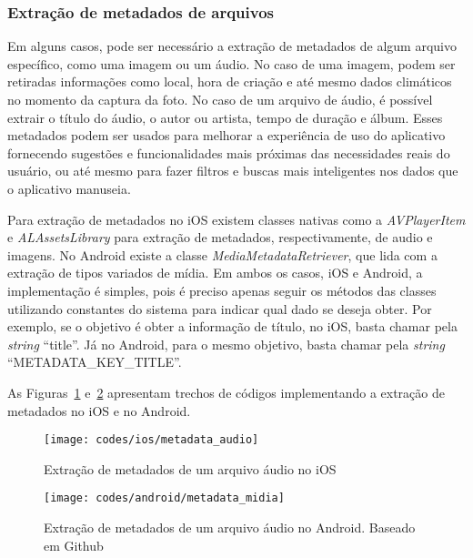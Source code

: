 \subsubsection{Extração de metadados de arquivos} \label{subsubsec:extracaometadata}
Em alguns casos, pode ser necessário a extração de metadados de algum arquivo específico, como uma imagem ou um áudio. No caso de uma imagem, podem ser retiradas informações como local, hora de criação e até mesmo 
dados climáticos no momento da captura da foto. No caso de um arquivo de áudio, é possível extrair o título do áudio, o autor ou artista, tempo de duração e álbum. Esses metadados podem ser usados para 
melhorar a experiência de uso do aplicativo fornecendo sugestões e funcionalidades mais próximas das necessidades reais do usuário, ou até mesmo para fazer filtros e buscas mais inteligentes nos dados que o 
aplicativo manuseia. 

Para extração de metadados no iOS existem classes nativas como a \textit{AVPlayerItem} e \textit{ALAssetsLibrary} para extração de metadados, respectivamente, de audio e imagens. No Android existe a 
classe \textit{MediaMetadataRetriever}, que lida com a extração de tipos variados de mídia. Em ambos os casos, iOS e Android, a implementação é simples, pois é preciso apenas seguir os métodos das classes 
utilizando constantes do sistema para indicar qual dado se deseja obter. Por exemplo, se o objetivo é obter a informação de título, no iOS, basta chamar pela \textit{string} ``title''. Já no Android, para o mesmo 
objetivo, basta chamar pela \textit{string} ``METADATA\_KEY\_TITLE''.

As Figuras~\ref{fig:metadata_audio-ios} e~\ref{fig:metadata_midia-android} apresentam trechos de códigos implementando a extração de metadados no iOS e no Android.

\begin{figure}[H]
	\centering
	\texttt{[image: codes/ios/metadata\_audio]}
	\caption[Extração de metadados de um arquivo áudio no iOS]{Extração de metadados de um arquivo áudio no iOS}
	\label{fig:metadata_audio-ios}
\end{figure}

\begin{figure}[H]
	\centering
	\texttt{[image: codes/android/metadata\_midia]}
	\caption[Extração de metadados de um arquivo áudio no Android]{Extração de metadados de um arquivo áudio no Android. Baseado em Github\protect\footnotemark}
	\label{fig:metadata_midia-android}
\end{figure}

